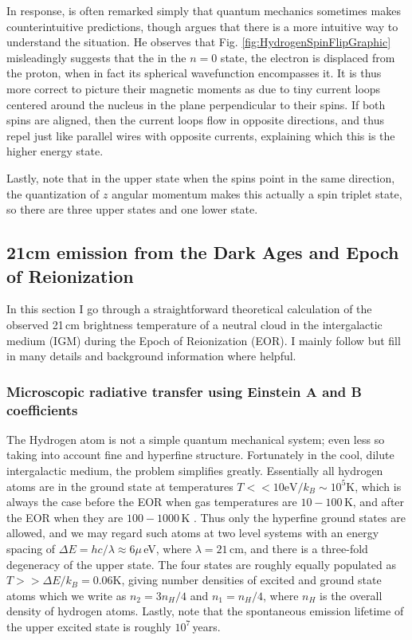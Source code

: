 {In response, is often remarked simply that quantum mechanics sometimes makes counterintuitive predictions, though \citet{griffiths82} argues that there is a more intuitive way to understand the situation. He observes that Fig. \ref{fig:HydrogenSpinFlipGraphic} misleadingly suggests that the in the $n=0$ state, the electron is displaced from the proton, when in fact its spherical wavefunction encompasses it. It is thus more correct to picture their magnetic moments as due to tiny current loops centered around the nucleus in the plane perpendicular to their spins. If both spins are aligned, then the current loops flow in opposite directions, and thus repel just like parallel wires with opposite currents, explaining which this is the higher energy state.

Lastly, note that in the upper state when the spins point in the same direction, the quantization of $z$ angular momentum makes this actually a spin triplet state, so there are three upper states and one lower state.

\subsection{21cm emission from the Dark Ages and Epoch of Reionization}

In this section I go through a straightforward theoretical calculation of the observed 21\,cm brightness temperature of a neutral cloud in the intergalactic medium (IGM) during the Epoch of Reionization (EOR). I mainly follow \citet{PritchardLoebReview} but fill in many details and background information where helpful. 

\subsubsection{Microscopic radiative transfer using Einstein A and B coefficients}

The Hydrogen atom is not a simple quantum mechanical system; even less so taking into account fine and hyperfine structure. Fortunately in the cool, dilute intergalactic medium, the problem simplifies greatly. Essentially all hydrogen atoms are in the ground state at temperatures  $T<<10\text{eV}/k_B\sim10^5$K, which is always the case before the EOR when gas temperatures are $10-100$\,K, and after the EOR when they are $100-1000$\,K \citep{FurlanettoReview}. Thus only the hyperfine ground states are allowed, and we may regard such atoms at two level systems with an energy spacing of $\Delta E=hc/\lambda\approx6\mu$\,eV, where $\lambda=21$\,cm, and there is a three-fold degeneracy of the upper state. The four states are roughly equally populated as $T>>\Delta E/k_B =0.06$K, giving number densities of excited and ground state atoms which we write as $n_2=3n_H/4$ and $n_1=n_H/4$, where $n_H$ is the overall density of hydrogen atoms. Lastly, note that the spontaneous emission lifetime of the upper excited state is roughly $10^7$\,years.

}
